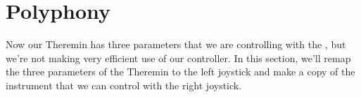 






\section{Polyphony}

Now our Theremin has three parameters that we are controlling with the \gt, but we're not making very efficient
use of our controller.  In this section, we'll remap the three parameters of the Theremin to the left 
joystick and make a copy of the instrument that we can control with the right joystick.

